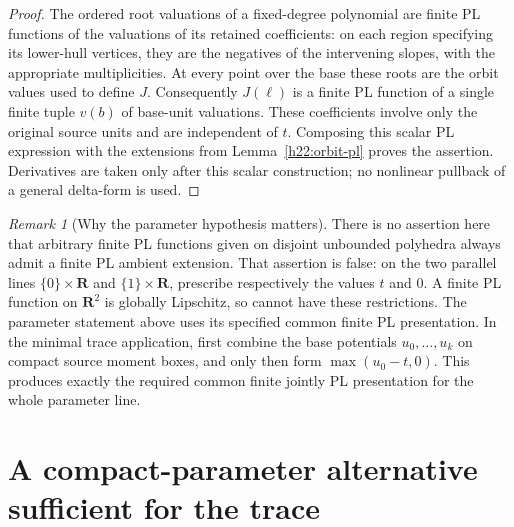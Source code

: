 \documentclass[11pt,a4paper]{article}
\theoremstyle{definition}
\theoremstyle{remark}
\newtheorem{remark}[theorem]{Remark}
\newcommand{\R}{\mathbf R}
\begin{document}
\begin{proof}
The ordered root valuations of a fixed-degree polynomial are finite
PL functions of the valuations of its retained coefficients: on each
region specifying its lower-hull vertices, they are the negatives of
the intervening slopes, with the appropriate multiplicities. At every
point over the base these roots are the orbit values used to define
$J$. Consequently $J(\ell)$ is a finite PL function of a single finite
tuple $v(b)$ of base-unit valuations. These coefficients involve only
the original source units and are independent of $t$. Composing this
scalar PL expression with the extensions from
Lemma~\ref{h22:orbit-pl} proves the assertion. Derivatives are taken
only after this scalar construction; no nonlinear pullback of a
general delta-form is used.
\end{proof}

\begin{remark}[Why the parameter hypothesis matters]\label{h22:parameter-scope}
There is no assertion here that arbitrary finite PL functions given
on disjoint unbounded polyhedra always admit a finite PL ambient
extension. That assertion is false: on the two parallel lines
$\{0\}\times\R$ and $\{1\}\times\R$, prescribe respectively the
values $t$ and $0$. A finite PL function on $\R^2$ is globally
Lipschitz, so cannot have these restrictions. The parameter statement
above uses its specified common finite PL presentation. In the minimal
trace application, first combine the base potentials $u_0,\ldots,u_k$
on compact source moment boxes, and only then form
$\max(u_0-t,0)$. This produces exactly the required common finite
jointly PL presentation for the whole parameter line.
\end{remark}

\section{A compact-parameter alternative sufficient for the trace}
\end{document}
